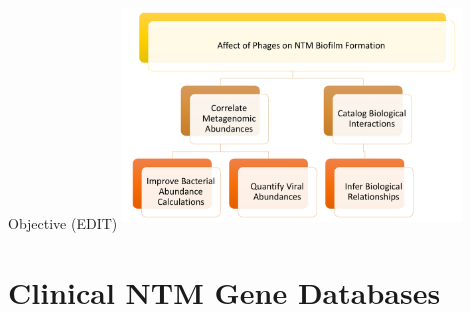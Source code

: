 \documentclass[11pt]{beamer}
\begin{document}
	\begin{frame}{Objective (EDIT)}
	\center
	\includegraphics[height=6cm, width=9cm]{objective.png}
	
	\end{frame}

	
\section{Clinical NTM Gene Databases}
\end{document}
